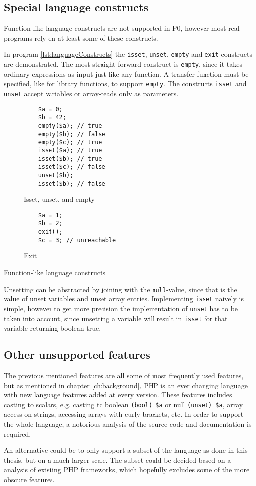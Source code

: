 \subsection{Special language constructs}

Function-like language constructs are not supported in P0, however most real programs rely on at least some of these constructs. 

In program \ref{lst:languageConstructs} the \texttt{isset}, \texttt{unset}, \texttt{empty} and \texttt{exit} constructs are demonstrated. The most straight-forward construct is \texttt{empty}, since it takes ordinary expressions as input just like any function. A transfer function must be specified, like for library functions, to support \texttt{empty}. The constructs \texttt{isset} and \texttt{unset} accept variables or array-reads only as parameters. 

\begin{program}
\begin{subfigure}[b]{.45\linewidth}
    \begin{lstlisting}
    $a = 0;
    $b = 42;
    empty($a); // true
    empty($b); // false
    empty($c); // true
    isset($a); // true
    isset($b); // true
    isset($c); // false
    unset($b);
    isset($b); // false
\end{lstlisting}
    \caption{Isset, unset, and empty}
\end{subfigure}
\begin{subfigure}[b]{.50\linewidth}
    \begin{lstlisting}
    $a = 1;
    $b = 2;
    exit();
    $c = 3; // unreachable
\end{lstlisting}
    \caption{Exit}
\end{subfigure}
\caption{Function-like language constructs}
\label{lst:languageConstructs}
\end{program}


Unsetting can be abstracted by joining with the \texttt{null}-value, since that is the value of unset variables and unset array entries. Implementing \texttt{isset} naively is simple, however to get more precision the implementation of \texttt{unset} has to be taken into account, since unsetting a variable will result in \texttt{isset} for that variable returning boolean true. 


\subsection{Other unsupported features}
The previous mentioned features are all some of most frequently used features, but as mentioned in chapter \ref{ch:background}, PHP is an ever changing language with new language features added at every version. These features includes casting to scalars, e.g. casting to boolean \texttt{(bool) \$a} or null \texttt{(unset) \$a}, array access on strings, accessing arrays with curly brackets, etc. In order to support the whole language, a notorious analysis of the source-code and documentation is required. 

An alternative could be to only support a subset of the language as done in this thesis, but on a much larger scale. The subset could be decided based on a analysis of existing PHP frameworks, which hopefully excludes some of the more obscure features.





 